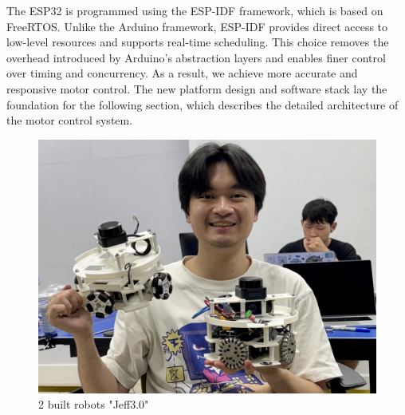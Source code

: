         The ESP32 is programmed using the ESP-IDF framework, which is based on FreeRTOS. Unlike the Arduino framework, ESP-IDF provides direct access to low-level resources and supports real-time scheduling. This choice removes the overhead introduced by Arduino’s abstraction layers and enables finer control over timing and concurrency. As a result, we achieve more accurate and responsive motor control.
The new platform design and software stack lay the foundation for the following section, which describes the detailed architecture of the motor control system.  
\begin{figure} [H]
    \centering
    \includegraphics[width=0.65\linewidth]{assets/images/hardware/IMG_8290.jpeg}
    \caption{2 built robots "Jeff3.0"}
    \label{fig:have2robots}
\end{figure}



